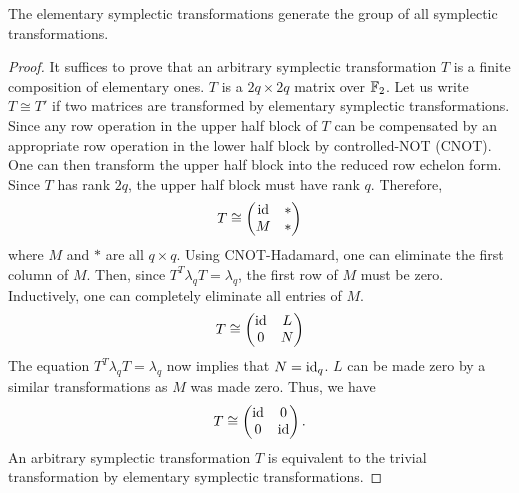 \begin{prop}
\cite{CalderbankRainsShorEtAl1997Quantum}
The elementary symplectic transformations generate the group of all symplectic transformations.
\end{prop}
\label{prop:elem-sym-transformation-generates-whole-BlockCodeCase}
\begin{proof}
It suffices to prove that an arbitrary symplectic transformation $T$ is
a finite composition of elementary ones. $T$ is a $2q \times 2q$ matrix over $\mathbb{F}_2$.
Let us write $T \cong T'$ if two matrices are transformed by elementary symplectic transformations.
Since any row operation in the upper half block of $T$
can be compensated by an appropriate row operation in the lower half block
by controlled-NOT (CNOT).
One can then transform the upper half block into the reduced row echelon form.
Since $T$ has rank $2q$, the upper half block must have rank $q$.
Therefore,
\[
 T \cong \begin{pmatrix} \mathrm{id} & * \\ M & * \end{pmatrix}
\]
where $M$ and $*$ are all $q \times q$.
Using CNOT-Hadamard, one can eliminate the first column of $M$.
Then, since $T^T \lambda_q T = \lambda_q$, the first row of $M$ must be zero.
Inductively, one can completely eliminate all entries of $M$.
\[
 T \cong \begin{pmatrix} \mathrm{id} & L \\ 0 & N \end{pmatrix}
\]
The equation $T^T \lambda_q T = \lambda_q$ now implies that $N = \mathrm{id}_q$.
$L$ can be made zero by a similar transformations as $M$ was made zero.
Thus, we have
\[
 T \cong \begin{pmatrix} \mathrm{id} & 0 \\ 0 & \mathrm{id} \end{pmatrix}.
\]
An arbitrary symplectic transformation $T$ is equivalent to the trivial transformation by elementary symplectic transformations.
\end{proof}


